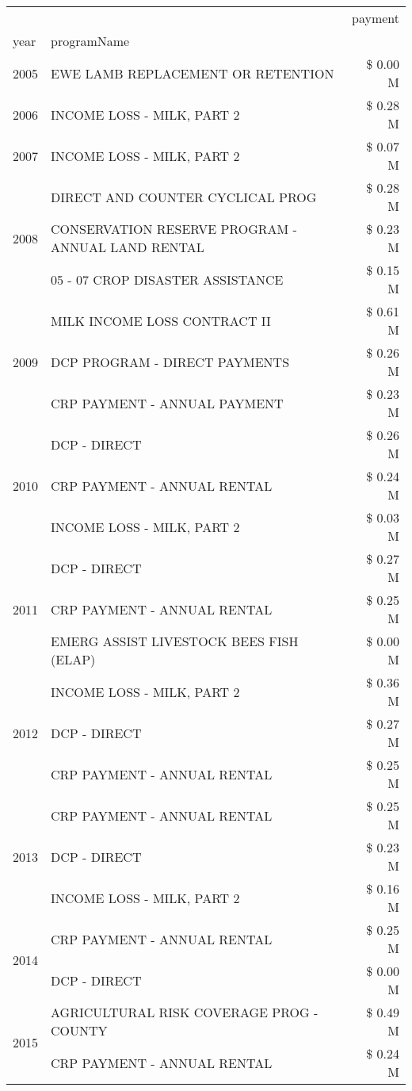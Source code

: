 \begin{tabular}{llr}
\toprule
 &  & payment \\
year & programName &  \\
\midrule
2005 & EWE LAMB REPLACEMENT OR RETENTION & \$ 0.00 M \\
\cline{1-3}
2006 & INCOME LOSS - MILK, PART 2 & \$ 0.28 M \\
\cline{1-3}
2007 & INCOME LOSS - MILK, PART 2 & \$ 0.07 M \\
\cline{1-3}
\multirow[t]{3}{*}{2008} & DIRECT AND COUNTER CYCLICAL PROG & \$ 0.28 M \\
 & CONSERVATION RESERVE PROGRAM - ANNUAL LAND RENTAL & \$ 0.23 M \\
 & 05 - 07 CROP DISASTER ASSISTANCE & \$ 0.15 M \\
\cline{1-3}
\multirow[t]{3}{*}{2009} & MILK INCOME LOSS CONTRACT II & \$ 0.61 M \\
 & DCP PROGRAM - DIRECT PAYMENTS & \$ 0.26 M \\
 & CRP PAYMENT - ANNUAL PAYMENT & \$ 0.23 M \\
\cline{1-3}
\multirow[t]{3}{*}{2010} & DCP - DIRECT & \$ 0.26 M \\
 & CRP PAYMENT - ANNUAL RENTAL & \$ 0.24 M \\
 & INCOME LOSS - MILK, PART 2 & \$ 0.03 M \\
\cline{1-3}
\multirow[t]{3}{*}{2011} & DCP - DIRECT & \$ 0.27 M \\
 & CRP PAYMENT - ANNUAL RENTAL & \$ 0.25 M \\
 & EMERG ASSIST LIVESTOCK BEES FISH (ELAP) & \$ 0.00 M \\
\cline{1-3}
\multirow[t]{3}{*}{2012} & INCOME LOSS - MILK, PART 2 & \$ 0.36 M \\
 & DCP - DIRECT & \$ 0.27 M \\
 & CRP PAYMENT - ANNUAL RENTAL & \$ 0.25 M \\
\cline{1-3}
\multirow[t]{3}{*}{2013} & CRP PAYMENT - ANNUAL RENTAL & \$ 0.25 M \\
 & DCP - DIRECT & \$ 0.23 M \\
 & INCOME LOSS - MILK, PART 2 & \$ 0.16 M \\
\cline{1-3}
\multirow[t]{2}{*}{2014} & CRP PAYMENT - ANNUAL RENTAL & \$ 0.25 M \\
 & DCP - DIRECT & \$ 0.00 M \\
\cline{1-3}
\multirow[t]{2}{*}{2015} & AGRICULTURAL RISK COVERAGE PROG - COUNTY & \$ 0.49 M \\
 & CRP PAYMENT - ANNUAL RENTAL & \$ 0.24 M \\

\end{tabular}
